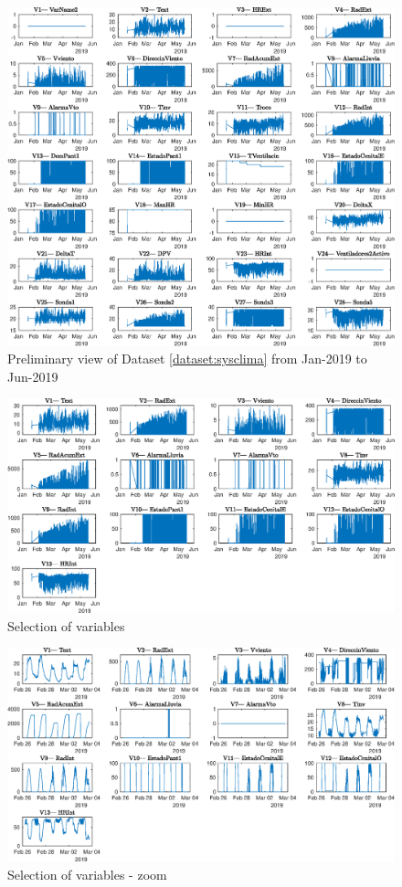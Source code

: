 \begin{figure}[ht!]
    \centering
    \includegraphics[scale=0.65]{img/fulldata.eps}
    \caption{Preliminary view of Dataset \ref{dataset:sysclima} from Jan-2019 to Jun-2019 }
    \label{fig:ViewDataSetSysClima}
\end{figure}

\begin{figure}
    \centering
    \includegraphics[scale=0.55]{img/fulldata_remove_no_data.eps}
    \caption{Selection of variables}
    \label{fig:ViewDataSetSysClimaCompact}
\end{figure}
\begin{figure}
    \centering
    \includegraphics[scale=0.55]{img/fulldata_remove_no_data_zoom.eps}
    \caption{Selection of variables - zoom }
\end{figure}


